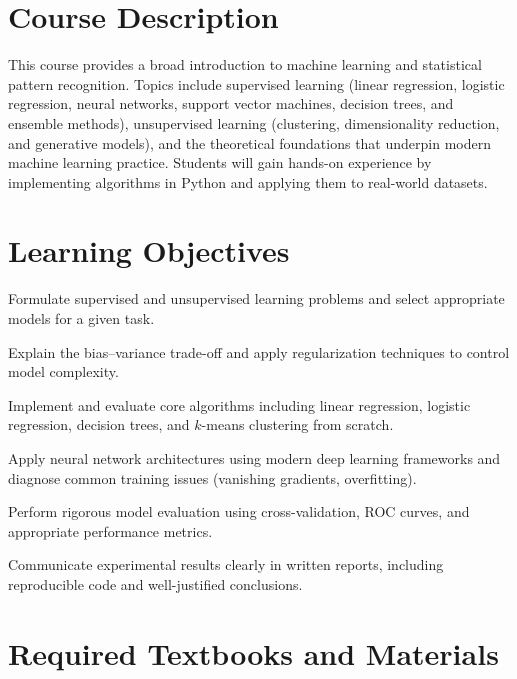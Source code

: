 \documentclass[
    language=english,
    doctype=syllabus,
    institution=none,
]{../../omnilatex}
\begin{document}
\maketitle

\section{Course Description}

This course provides a broad introduction to machine learning and statistical
pattern recognition.  Topics include supervised learning (linear regression,
logistic regression, neural networks, support vector machines, decision trees,
and ensemble methods), unsupervised learning (clustering, dimensionality
reduction, and generative models), and the theoretical foundations that underpin
modern machine learning practice.  Students will gain hands-on experience by
implementing algorithms in Python and applying them to real-world datasets.

\section{Learning Objectives}

\begin{objectives}
    \item Formulate supervised and unsupervised learning problems and select
          appropriate models for a given task.
    \item Explain the bias--variance trade-off and apply regularization
          techniques to control model complexity.
    \item Implement and evaluate core algorithms including linear regression,
          logistic regression, decision trees, and $k$-means clustering from
          scratch.
    \item Apply neural network architectures using modern deep learning
          frameworks and diagnose common training issues (vanishing gradients,
          overfitting).
    \item Perform rigorous model evaluation using cross-validation, ROC curves,
          and appropriate performance metrics.
    \item Communicate experimental results clearly in written reports, including
          reproducible code and well-justified conclusions.
\end{objectives}

\section{Required Textbooks and Materials}
\end{document}
